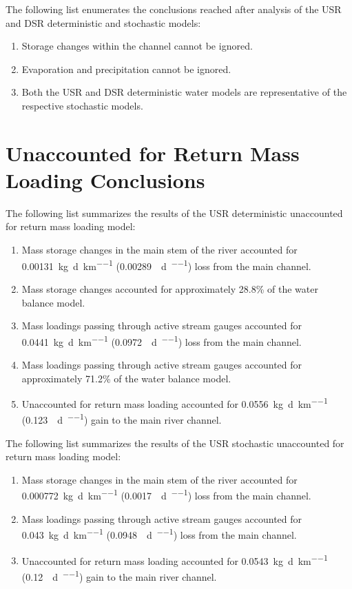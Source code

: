 \begin{linenumbers}
The following list enumerates the conclusions reached after analysis of the USR and DSR deterministic and stochastic models:
\begin{enumerate}
	\item Storage changes within the channel cannot be ignored.
	\item Evaporation and precipitation cannot be ignored.
	\item Both the USR and DSR deterministic water models are representative of the respective stochastic models.
\end{enumerate}
\clearpage{}

\section{Unaccounted for Return Mass Loading Conclusions}
\label{sec:ReturnMassConclusions}

The following list summarizes the results of the USR deterministic unaccounted for return mass loading model:
\begin{enumerate}
	\item Mass storage changes in the main stem of the river accounted for \SI{0.00131}{\kilo\g\per\day\per\kilo\m} (\SI{0.00289}{\pound\per\day\per\mile}) loss from the main channel.
	\item Mass storage changes accounted for approximately 28.8\% of the water balance model.
	\item Mass loadings passing through active stream gauges accounted for \SI{0.0441}{\kilo\g\per\day\per\kilo\m} (\SI{0.0972}{\pound\per\day\per\mile}) loss from the main channel.
	\item Mass loadings passing through active stream gauges accounted for approximately 71.2\% of the water balance model.
	\item Unaccounted for return mass loading accounted for \SI{0.0556}{\kilo\g\per\day\per\kilo\m} (\SI{0.123}{\pound\per\day\per\mile}) gain to the main river channel.
\end{enumerate}

The following list summarizes the results of the USR stochastic unaccounted for return mass loading model:
\begin{enumerate}
	\item Mass storage changes in the main stem of the river accounted for \SI{0.000772}{\kilo\g\per\day\per\kilo\m} (\SI{0.0017}{\pound\per\day\per\mile}) loss from the main channel.
	\item Mass loadings passing through active stream gauges accounted for \SI{0.043}{\kilo\g\per\day\per\kilo\m} (\SI{0.0948}{\pound\per\day\per\mile}) loss from the main channel.
	\item Unaccounted for return mass loading accounted for \SI{0.0543}{\kilo\g\per\day\per\kilo\m} (\SI{0.12}{\pound\per\day\per\mile}) gain to the main river channel.
\end{enumerate}



\end{linenumbers}
